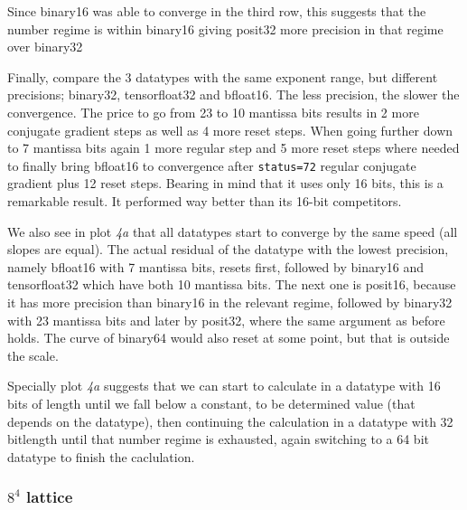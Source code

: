 \documentclass{article}
\theoremstyle{plain} %
\theoremstyle{remark} %
\def\code#1{\texttt{#1}}
\numberwithin{equation}{section}
\begin{document}
Since \gls{binary16} was able to converge in the third row, this suggests that the number regime is within \gls{binary16} giving \gls{posit32} more precision in that regime over \gls{binary32}

Finally, compare the \num{3} datatypes with the same exponent range, but different precisions; \gls{binary32}, \gls{tensorfloat32} and \gls{bfloat16}. The less precision, the slower the convergence. The price to go from \num{23} to \num{10} mantissa bits results in \num{2} more conjugate gradient steps as well as \num{4} more reset steps. When going further down to \num{7} mantissa bits again \num{1} more regular step and \num{5} more reset steps where needed to finally bring \gls{bfloat16} to convergence after \code{status=72} regular conjugate gradient plus \num{12} reset steps. Bearing in mind that it uses only \num{16} bits, this is a remarkable result. It performed way better than its \num{16}-bit competitors.

We also see in plot \textit{4a} that all datatypes start to converge by the same speed (all slopes are equal). The actual residual of the datatype with the lowest precision, namely \gls{bfloat16} with \num{7} mantissa bits, resets first, followed by \gls{binary16} and \gls{tensorfloat32} which have both \num{10} mantissa bits. The next one is \gls{posit16}, because it has more precision than \gls{binary16} in the relevant regime, followed by \gls{binary32} with \num{23} mantissa bits and later by \gls{posit32}, where the same argument as before holds. The curve of \gls{binary64} would also reset at some point, but that is outside the scale.

Specially plot \textit{4a} suggests that we can start to calculate in a datatype with \num{16} bits of length until we fall below a constant, to be determined value (that depends on the datatype), then continuing the calculation in a datatype with \num{32} bitlength until that number regime is exhausted, again switching to a \num{64} bit datatype to finish the caclulation.

\subsubsection{$8^4$ lattice}
\end{document}
